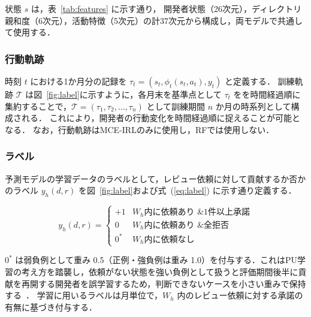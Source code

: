 \documentclass[submit,noauthor,ses,dvipdfmx]{ipsj}
\newcommand{\todo}[1]{\colorbox{yellow}{{\bf TODO}:}{\color{red} {\textbf{[#1]}}}}
\begin{document}
状態 $s$ は，表~\ref{tab:features} に示す通り，
開発者状態（26次元），ディレクトリ親和度（6次元），活動特徴（5次元）の計37次元から構成し，両モデルで共通して使用する．


\subsubsection{行動軌跡}

時刻 $t$ における1か月分の記録を $\tau_t = (s_t, \phi_{t}(s_t, a_t), y_t)$ と定義する．
訓練軌跡 $\mathcal{T}$ は図~\ref{fig:label}に示すように，各月末を基準点として $\tau_t$ をを時間経過順に集約することで，$\mathcal{T} = (\tau_1, \tau_2, \ldots, \tau_n)$ として訓練期間 $n$ か月の時系列として構成される．
これにより，開発者の行動変化を時間経過順に捉えることが可能となる．
なお，行動軌跡はMCE-IRLのみに使用し，RFでは使用しない．

\subsubsection{ラベル}
予測モデルの学習データのラベルとして，レビュー依頼に対して貢献するか否かのラベル $y_h(d, r)$ を図~\ref{fig:label}および式~(\ref{eq:label}) に示す通り定義する．

\begin{equation}
  y_h(d, r) =
  \begin{cases}
  +1 & W_h\text{内に依頼あり \& 1件以上承諾} \\
  0  & W_h\text{内に依頼あり \& 全拒否} \\
  0^* & W_h\text{内に依頼なし}
  \end{cases}
\label{eq:label}
\end{equation}

$0^*$ は弱負例として重み 0.5（正例・強負例は重み 1.0）を付与する．これはPU学習の考え方を踏襲し，依頼がない状態を強い負例として扱うと評価期間後半に貢献を再開する開発者を誤学習するため，判断できないケースを小さい重みで保持する~\cite{elkan_noto}．
学習に用いるラベルは月単位で，$W_h$ 内のレビュー依頼に対する承諾の有無に基づき付与する．
\end{document}
